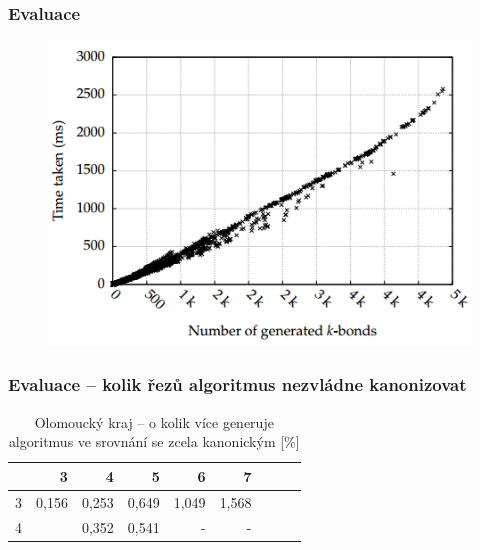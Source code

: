 \documentclass[10pt]{beamer}
\newcommand{\evenrowcolor}{\rowcolor[gray]{0.925}}
\begin{document}
\begin{frame}
	\frametitle{Evaluace}

	\begin{figure}
		\includegraphics[scale=0.6]{images/capture1_2.PNG}
	\end{figure}

\end{frame}

\begin{frame}
	\frametitle{Evaluace -- kolik řezů algoritmus nezvládne kanonizovat}

\begin{table}[H]
	\caption{Olomoucký kraj -- o kolik více generuje algoritmus ve srovnání se zcela kanonickým [\%]}
	\centering
	\begin{tabular}{c|rrrrrrrr}

\toprule

            &         3 &         4 &         5 &         6 &         7 \\ \midrule
         3  &     0,156 &     0,253 &     0,649 &     1,049 &     1,568 \\
\evenrowcolor
         4  &           &     0,352 &     0,541 &         -  &       -  \\

	\end{tabular}
\end{table}

\end{frame}
\end{document}
